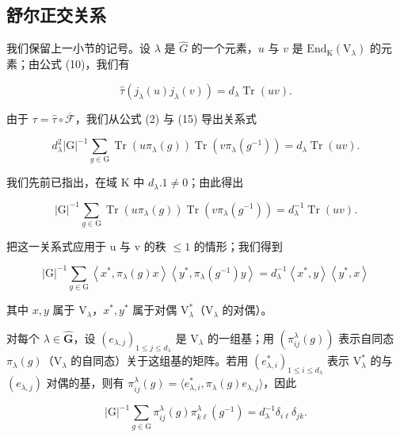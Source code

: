 \subsection{舒尔正交关系}

我们保留上一小节的记号。设 \(\lambda\) 是 \(\widehat{G}\) 的一个元素，\(u\) 与 \(v\) 是 \(\mathrm{End}_{\mathrm{K}}(\mathrm{V}_{\lambda})\) 的元素；由公式 (10)，我们有

\[
\hat {\tau} (j _ {\lambda} (u) j _ {\lambda} (v)) = d _ {\lambda} \operatorname{Tr} (u v).
\]

由于 \(\tau = \hat{\tau} \circ \overline{\mathcal{F}}\)，我们从公式 (2) 与 (15) 导出关系式

\[
d _ {\lambda} ^ {2} | \mathrm{G} | ^ {- 1} \sum_ {g \in \mathrm{G}} \operatorname{Tr} (u \pi_ {\lambda} (g)) \operatorname{Tr} (v \pi_ {\lambda} (g ^ {- 1})) = d _ {\lambda} \operatorname{Tr} (u v).
\]

我们先前已指出，在域 K 中 \(d_{\lambda}.1 \neq 0\)；由此得出

\[
| \mathrm{G} | ^ {- 1} \sum_ {g \in \mathrm{G}} \operatorname{Tr} (u \pi_ {\lambda} (g)) \operatorname{Tr} (v \pi_ {\lambda} (g ^ {- 1})) = d _ {\lambda} ^ {- 1} \operatorname{Tr} (u v).\tag{20}
\]

把这一关系式应用于 u 与 v 的秩 \(\leqslant 1\) 的情形；我们得到

\[
| \mathrm{G} | ^ {- 1} \sum_ {g \in \mathrm{G}} \left\langle x ^ {*}, \pi_ {\lambda} (g) x \right\rangle \left\langle y ^ {*}, \pi_ {\lambda} \left(g ^ {- 1}\right) y \right\rangle = d _ {\lambda} ^ {- 1} \left\langle x ^ {*}, y \right\rangle \left\langle y ^ {*}, x \right\rangle\tag{21}
\]

其中 \(x, y\) 属于 \(\mathrm{V}_{\lambda}\)，\(x^{*}, y^{*}\) 属于对偶 \(\mathrm{V}_{\lambda}^{*}\)（\(\mathrm{V}_{\lambda}\) 的对偶）。

对每个 \(\lambda \in \widehat{\mathbf{G}}\)，设 \((e_{\lambda,j})_{1\leqslant j\leqslant d_{\lambda}}\) 是 \(\mathrm{V}_{\lambda}\) 的一组基；用 \((\pi_{ij}^{\lambda}(g))\) 表示自同态 \(\pi_{\lambda}(g)\)（\(\mathrm{V}_{\lambda}\) 的自同态）关于这组基的矩阵。若用 \((e_{\lambda,i}^{*})_{1\leqslant i\leqslant d_{\lambda}}\) 表示 \(\mathrm{V}_{\lambda}^{*}\) 的与 \((e_{\lambda,j})\) 对偶的基，则有 \(\pi_{ij}^{\lambda}(g) = \langle e_{\lambda,i}^{*}, \pi_{\lambda}(g)e_{\lambda,j}\rangle\)，因此

\[
| \mathrm{G} | ^ {- 1} \sum_ {g \in \mathrm{G}} \pi_ {i j} ^ {\lambda} (g) \pi_ {k \ell} ^ {\lambda} (g ^ {- 1}) = d _ {\lambda} ^ {- 1} \delta_ {i \ell} \delta_ {j k}.\tag{22}
\]

